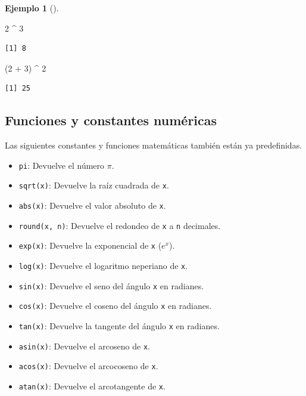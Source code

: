 \documentclass[
  a4paper,
]{scrreport}
\newenvironment{Shaded}{\begin{snugshade}}{\end{snugshade}}
\newcommand{\DecValTok}[1]{\textcolor[rgb]{0.68,0.00,0.00}{#1}}
\newcommand{\NormalTok}[1]{\textcolor[rgb]{0.00,0.23,0.31}{#1}}
\newcommand{\SpecialCharTok}[1]{\textcolor[rgb]{0.37,0.37,0.37}{#1}}
\providecommand{\tightlist}{%
  \setlength{\itemsep}{0pt}\setlength{\parskip}{0pt}}\usepackage{longtable,booktabs,array}
\theoremstyle{definition}
\theoremstyle{definition}
\newtheorem{example}{Ejemplo}[chapter]
\theoremstyle{remark}
\begin{document}
\begin{example}[]
\begin{Shaded}
\begin{Highlighting}[]
\DecValTok{2} \SpecialCharTok{\^{}} \DecValTok{3}
\end{Highlighting}
\end{Shaded}

\begin{verbatim}
[1] 8
\end{verbatim}

\begin{Shaded}
\begin{Highlighting}[]
\NormalTok{(}\DecValTok{2} \SpecialCharTok{+} \DecValTok{3}\NormalTok{) }\SpecialCharTok{\^{}} \DecValTok{2}
\end{Highlighting}
\end{Shaded}

\begin{verbatim}
[1] 25
\end{verbatim}

\end{example}

\subsection{Funciones y constantes
numéricas}\label{funciones-y-constantes-numuxe9ricas}

Las siguientes constantes y funciones matemáticas también están ya
predefinidas.

\begin{itemize}
\tightlist
\item
  \texttt{pi}: Devuelve el número \(\pi\).
\item
  \texttt{sqrt(x)}: Devuelve la raíz cuadrada de \texttt{x}.
\item
  \texttt{abs(x)}: Devuelve el valor absoluto de \texttt{x}.
\item
  \texttt{round(x,\ n)}: Devuelve el redondeo de \texttt{x} a \texttt{n}
  decimales.
\item
  \texttt{exp(x)}: Devuelve la exponencial de \texttt{x} (\(e^x\)).
\item
  \texttt{log(x)}: Devuelve el logaritmo neperiano de \texttt{x}.
\item
  \texttt{sin(x)}: Devuelve el seno del ángulo \texttt{x} en radianes.
\item
  \texttt{cos(x)}: Devuelve el coseno del ángulo \texttt{x} en radianes.
\item
  \texttt{tan(x)}: Devuelve la tangente del ángulo \texttt{x} en
  radianes.
\item
  \texttt{asin(x)}: Devuelve el arcoseno de \texttt{x}.
\item
  \texttt{acos(x)}: Devuelve el arcocoseno de \texttt{x}.
\item
  \texttt{atan(x)}: Devuelve el arcotangente de \texttt{x}.
\end{itemize}
\end{document}
